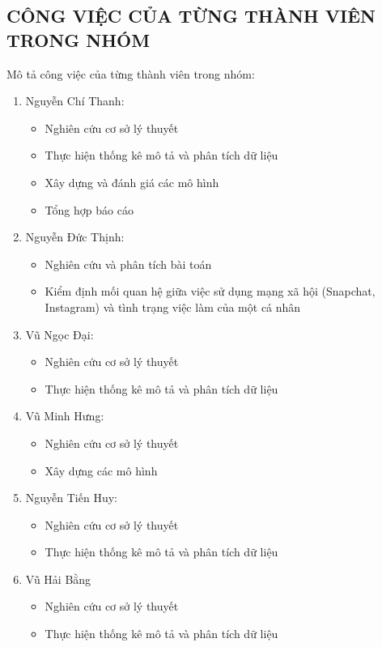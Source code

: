 \newpage
\begin{center}
    \section*{CÔNG VIỆC CỦA TỪNG THÀNH VIÊN TRONG NHÓM}
\end{center}

Mô tả công việc của từng thành viên trong nhóm:

\begin{enumerate}
    \item Nguyễn Chí Thanh:
    \begin{itemize}
        \item Nghiên cứu cơ sở lý thuyết
        \item Thực hiện thống kê mô tả và phân tích dữ liệu 
        \item Xây dựng và đánh giá các mô hình
        \item Tổng hợp báo cáo
    \end{itemize}
    \item Nguyễn Đức Thịnh:
    \begin{itemize}
        \item Nghiên cứu và phân tích bài toán
        \item Kiểm định mối quan hệ giữa việc sử dụng mạng xã hội (Snapchat, Instagram) và tình trạng việc làm của một cá nhân
    \end{itemize}
    \item Vũ Ngọc Đại:
    \begin{itemize}
        \item Nghiên cứu cơ sở lý thuyết
        \item Thực hiện thống kê mô tả và phân tích dữ liệu 
    \end{itemize}
    \item Vũ Minh Hưng:
    \begin{itemize}
        \item Nghiên cứu cơ sở lý thuyết
        \item Xây dựng các mô hình
    \end{itemize}
    \item Nguyễn Tiến Huy:
    \begin{itemize}
        \item Nghiên cứu cơ sở lý thuyết
        \item Thực hiện thống kê mô tả và phân tích dữ liệu 
    \end{itemize}
    \item Vũ Hải Bằng
    \begin{itemize}
        \item Nghiên cứu cơ sở lý thuyết
        \item Thực hiện thống kê mô tả và phân tích dữ liệu 
    \end{itemize}
\end{enumerate}

